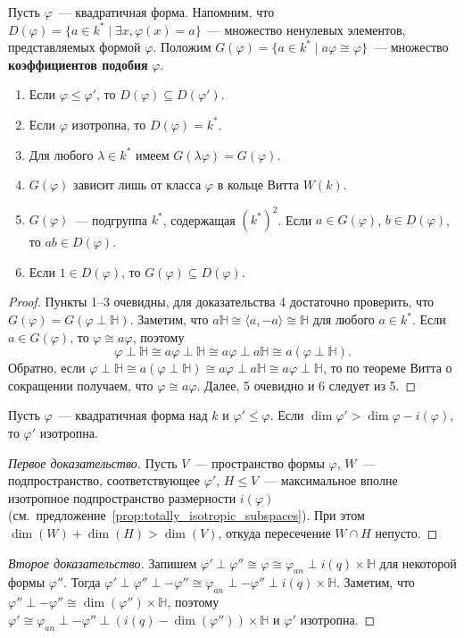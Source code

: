 \documentclass[a4paper,oneside,12pt]{article}
\theoremstyle{plain} { \swapnumbers
\newtheorem{theorem}{Теорема}[subsection]
\newtheorem{corollary}[theorem]{Следствие}
\newtheorem{lemma}[theorem]{Лемма}
\newtheorem{proposition}[theorem]{Утверждение}
\newtheorem{claim}[theorem]{Факт}
}
\theoremstyle{definition} { \swapnumbers
\newtheorem{definition}[theorem]{Определение}
\newtheorem{notation}[theorem]{Обозначение}
\newtheorem{remark}[theorem]{Замечание}
\newtheorem{remarks}[theorem]{Замечания}
\newtheorem{example}[theorem]{Пример}
\newtheorem{examples}[theorem]{Примеры}
\newtheorem{sssection}[theorem]{}
}
\def\ph{\varphi}
\def\la{\langle}
\def\ra{\rangle}
\begin{document}
\begin{definition}
Пусть $\ph$~--- квадратичная форма. Напомним, что $D(\ph)=\{a\in k^*\mid\exists x, \ph(x)=a\}$~--- множество
ненулевых элементов, представляемых формой $\ph$. Положим
$G(\ph)=\{a\in k^*\mid a\ph\cong\ph\}$~--- множество {\bf коэффициентов подобия} $\ph$.
\end{definition}
\begin{lemma}
\begin{enumerate}
\item Если $\ph\leq\ph'$, то $D(\ph)\subseteq D(\ph')$.
\item Если $\ph$ изотропна, то $D(\ph)=k^*$.
\item Для любого $\lambda\in k^*$ имеем $G(\lambda\ph)=G(\ph)$.
\item $G(\ph)$ зависит лишь от класса $\ph$ в кольце Витта $W(k)$.
\item $G(\ph)$~--- подгруппа $k^*$, содержащая $(k^*)^2$. Если $a\in G(\ph)$, $b\in D(\ph)$,
то $ab\in D(\ph)$.
\item Если $1\in D(\ph)$, то $G(\ph)\subseteq D(\ph)$.
\end{enumerate}
\end{lemma}
\begin{proof}
Пункты 1--3 очевидны, для доказательства 4 достаточно проверить, что $G(\ph)=G(\ph\perp\mathbb H)$.
Заметим, что $a\mathbb H\cong\la a,-a\ra\cong\mathbb H$ для любого $a\in k^*$.
Если $a\in G(\ph)$, то $\ph\cong a\ph$, поэтому
$$
\ph\perp\mathbb H\cong a\ph\perp\mathbb H\cong a\ph\perp a\mathbb H\cong a(\ph\perp\mathbb H).
$$
Обратно, если $\ph\perp\mathbb H\cong a(\ph\perp\mathbb H)\cong a\ph\perp a\mathbb H\cong
a\ph\perp\mathbb H$, то по теореме Витта о сокращении получаем, что $\ph\cong a\ph$.
Далее, 5 очевидно и 6 следует из 5.
\end{proof}

\begin{lemma}
Пусть $\ph$~--- квадратичная форма над $k$ и $\ph'\leq\ph$. Если $\dim\ph'>\dim\ph-i(\ph)$,
то $\ph'$ изотропна.
\end{lemma}
\begin{proof}[Первое доказательство]
Пусть $V$~--- пространство формы $\ph$, $W$~--- подпространство, соответствующее $\ph'$,
$H\leq V$~--- максимальное вполне изотропное подпространство размерности $i(\ph)$
(см.~предложение~\ref{prop:totally_isotropic_subspaces}).
При этом $\dim(W)+\dim(H)>\dim(V)$, откуда пересечение $W\cap H$ непусто.
\end{proof}
\begin{proof}[Второе доказательство]
Запишем $\ph'\perp\ph''\cong\ph\cong\ph_{an}\perp i(q)\times\mathbb H$ для некоторой формы $\ph''$.
Тогда $\ph'\perp\ph''\perp-\ph''\cong\ph_{an}\perp-\ph''\perp i(q)\times\mathbb H$. Заметим,
что $\ph''\perp-\ph''\cong\dim(\ph'')\times\mathbb H$, поэтому
$\ph'\cong\ph_{an}\perp-\ph''\perp(i(q)-\dim(\ph''))\times\mathbb H$ и $\ph'$ изотропна.
\end{proof}
\end{document}
